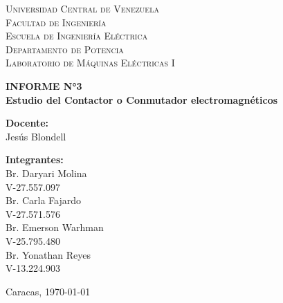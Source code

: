 \begin{titlepage}
    \begin{center}
        \textsc{Universidad Central de Venezuela}\\
        \textsc{Facultad de Ingeniería}\\
        \textsc{Escuela de Ingeniería Eléctrica}\\
        \textsc{Departamento de Potencia}\\
        \textsc{Laboratorio de Máquinas Eléctricas I}
        \vfill
        
        {\Large \bfseries INFORME N°3}\\[0.5cm]
        {\Large \bfseries Estudio del Contactor o Conmutador electromagnéticos}
        \vfill
        
        \begin{minipage}[t]{0.45\textwidth}
            \begin{flushleft}
                \textbf{Docente:}\\
                Jesús Blondell
            \end{flushleft}
        \end{minipage}%
        \hfill
        \begin{minipage}[t]{0.45\textwidth}
            \begin{flushright}
                \textbf{Integrantes:}\\
                Br. Daryari Molina\\
                V-27.557.097\\
                Br. Carla Fajardo\\
                V-27.571.576\\
                Br. Emerson Warhman\\
                V-25.795.480\\
                Br. Yonathan Reyes\\
                V-13.224.903
            \end{flushright}
        \end{minipage}
        
        \vfill
        
        {Caracas, \today}
    \end{center}
\end{titlepage}